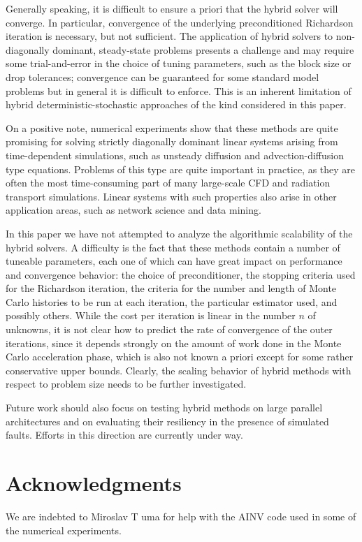 \documentclass[final,leqno,onefignum,onetabnum]{siamltex1213}
\begin{document}
Generally speaking, it is difficult to ensure a priori that the
hybrid solver will converge. In particular, convergence of the underlying
preconditioned Richardson iteration is necessary, but not sufficient. 
The application of hybrid solvers to non-diagonally dominant, steady-state
problems presents a challenge and may require some trial-and-error in the
choice of tuning parameters, such as the block size or drop tolerances; 
convergence can be guaranteed for some standard model problems but in 
general it is difficult to enforce.
This is an inherent limitation of hybrid deterministic-stochastic
approaches of the kind considered in this paper.

On a positive note, numerical experiments show that these methods 
are quite promising for solving strictly diagonally dominant linear systems 
arising from time-dependent simulations, such as unsteady diffusion and
advection-diffusion type equations. Problems of this type are quite
important in practice, as they are often the most time-consuming part
of many large-scale CFD and radiation transport simulations. 
Linear systems with such properties also arise in other application areas,
such as network science and data mining.

In this paper we have not attempted to analyze the algorithmic scalability 
of the hybrid solvers. A difficulty is the fact that these methods contain
a number of tuneable parameters, each one of which can have great impact on 
performance and convergence behavior:
the choice of preconditioner, the stopping
criteria used for the Richardson iteration, the criteria for the number
and length of Monte Carlo histories to be run at each iteration, the 
particular estimator used, and
possibly others. While the cost per iteration is linear in the
number $n$ of unknowns, it is not clear how to predict the rate of convergence of
the outer iterations, since it depends strongly on the amount of work
done in the Monte Carlo acceleration phase, which is also not known a
priori except for some rather conservative upper bounds. Clearly,
the scaling behavior of hybrid methods with respect to problem size
needs to be further investigated.

Future work should also focus on testing hybrid methods on 
large parallel architectures and on evaluating their resiliency in the presence
of simulated faults. Efforts in this direction are currently under way. 

\section*{Acknowledgments}
We are indebted to Miroslav T uma for help with the AINV code used
in some of the numerical experiments.
\end{document}
